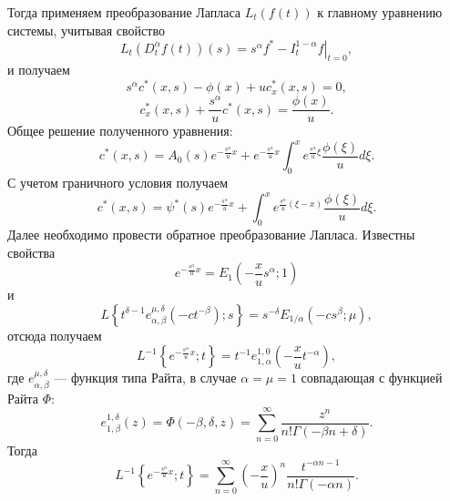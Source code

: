 Тогда применяем преобразование Лапласа $L_t(f(t))$ к главному уравнению системы, учитывая свойство
\begin{equation}
	L_t(D^\alpha_tf(t))(s) = s^\alpha f^* - \left. I^{1-\alpha}_tf \right|_{t=0},
\end{equation}
и получаем
\begin{equation}
	s^\alpha c^*(x,s) - \phi(x) + u c^*_x(x,s) = 0,
\end{equation}
\begin{equation}
	c^*_x(x,s) + \frac{s^\alpha}{u}c^*(x,s) = \frac{\phi(x)}{u}.
\end{equation}
Общее решение полученного уравнения:
\begin{equation}
	c^*(x,s) = A_0(s)e^{-\frac{s^\alpha}{u}x} + e^{-\frac{s^\alpha}{u}x} \int_0^x e^{\frac{s^\alpha}{u}\xi} \frac{\phi(\xi)}{u} d \xi.
\end{equation}
С учетом граничного условия получаем
\begin{equation}
	c^*(x,s) = \psi^*(s)e^{-\frac{s^\alpha}{u}x} + \int_0^x e^{\frac{s^\alpha}{u}(\xi - x)} \frac{\phi(\xi)}{u} d \xi.
\end{equation}
Далее необходимо провести обратное преобразование Лапласа. Известны свойства
\begin{equation}
	e^{-\frac{s^\alpha}{u}x} = E_1\left(-\frac{x}{u}s^\alpha; 1\right)
\end{equation}
и
\begin{equation}
	L\left\{t^{\delta - 1}e_{\alpha, \beta}^{\mu, \delta}\left(-ct^{-\beta}\right); s\right\}=
	s^{-\delta}E_{1 / \alpha}\left(-cs^\beta; \mu\right),
\end{equation}
отсюда получаем
\begin{equation}
	L^{-1}\left\{e^{-\frac{s^\alpha}{u}x}; t\right\} = t^{-1} e^{1,0}_{1, \alpha}\left(-\frac{x}{u}t^{-\alpha}\right),
\end{equation}
где $e_{\alpha, \beta}^{\mu, \delta}$ --- функция типа Райта, в случае $\alpha = \mu = 1$ совпадающая с функцией Райта $\Phi$:
\begin{equation}
	e_{1, \beta}^{1, \delta}(z) = \Phi\left(-\beta, \delta, z\right) =
	\sum_{n=0}^\infty\frac{z^n}{n!\Gamma(-\beta n + \delta)}.
\end{equation}
Тогда
\begin{equation}
	L^{-1}\left\{e^{-\frac{s^\alpha}{u}x}; t\right\} = 
	\sum_{n=0}^\infty\left(-\frac{x}{u}\right)^n \frac{t^{-\alpha n - 1}}{n!\Gamma(-\alpha n)}.
\end{equation}


